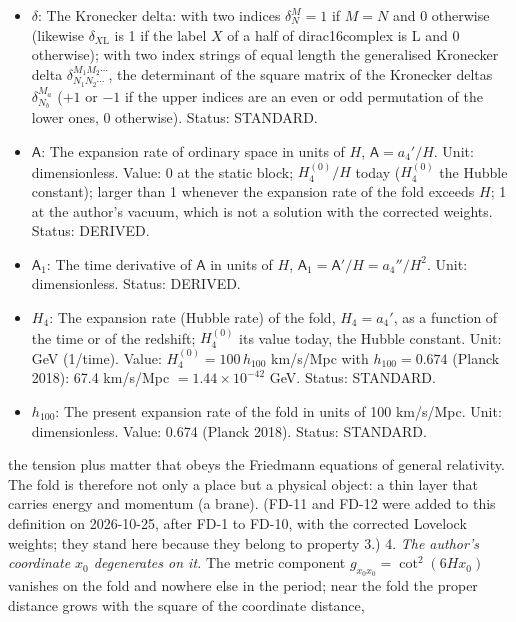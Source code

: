 \documentclass[
  10pt,
]{article}
\begin{document}
\begin{itemize}
  (1/length). Status: AUTHOR.
\item
  \(\delta\): The Kronecker delta: with two indices \(\delta^M_N = 1\)
  if \(M = N\) and 0 otherwise (likewise \(\delta_{X\mathrm{L}}\) is 1
  if the label \(X\) of a half of dirac16complex is L and 0 otherwise);
  with two index strings of equal length the generalised Kronecker delta
  \(\delta^{M_1M_2\cdots}_{N_1N_2\cdots}\), the determinant of the
  square matrix of the Kronecker deltas \(\delta^{M_a}_{N_b}\) (\(+1\)
  or \(-1\) if the upper indices are an even or odd permutation of the
  lower ones, 0 otherwise). Status: STANDARD.
\item
  \(\mathsf{A}\): The expansion rate of ordinary space in units of
  \(H\), \(\mathsf{A} = a_4'/H\). Unit: dimensionless. Value: 0 at the
  static block; \(H_4^{(0)}/H\) today (\(H_4^{(0)}\) the Hubble
  constant); larger than 1 whenever the expansion rate of the fold
  exceeds \(H\); 1 at the author's vacuum, which is not a solution with
  the corrected weights. Status: DERIVED.
\item
  \(\mathsf{A}_1\): The time derivative of \(\mathsf{A}\) in units of
  \(H\), \(\mathsf{A}_1 = \mathsf{A}'/H = a_4''/H^2\). Unit:
  dimensionless. Status: DERIVED.
\item
  \(H_4\): The expansion rate (Hubble rate) of the fold, \(H_4 = a_4'\),
  as a function of the time or of the redshift; \(H_4^{(0)}\) its value
  today, the Hubble constant. Unit: GeV (1/time). Value:
  \(H_4^{(0)} = 100\,h_{100}\) km/s/Mpc with \(h_{100} = 0.674\) (Planck
  2018): 67.4 km/s/Mpc \(= 1.44\times10^{-42}\) GeV. Status: STANDARD.
\item
  \(h_{100}\): The present expansion rate of the fold in units of 100
  km/s/Mpc. Unit: dimensionless. Value: 0.674 (Planck 2018). Status:
  STANDARD.
\end{itemize}

the tension plus matter that obeys the Friedmann equations of general
relativity. The fold is therefore not only a place but a physical
object: a thin layer that carries energy and momentum (a brane). (FD-11
and FD-12 were added to this definition on 2026-10-25, after FD-1 to
FD-10, with the corrected Lovelock weights; they stand here because they
belong to property 3.) 4. \emph{The author's coordinate \(x_0\)
degenerates on it.} The metric component \(g_{x_0x_0} = \cot^2(6Hx_0)\)
vanishes on the fold and nowhere else in the period; near the fold the
proper distance grows with the square of the coordinate distance,
\end{document}
